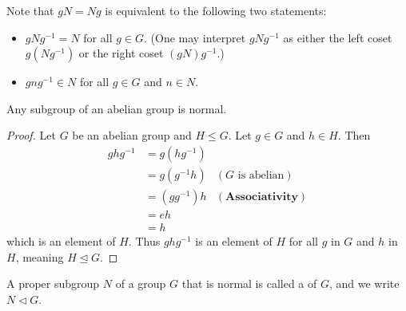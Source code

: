 Note that $gN = Ng$ is equivalent to the following two statements:
\begin{itemize}
    \item $gNg^{-1} = N$ for all $g \in G$. (One may interpret $gNg^{-1}$ as either the left coset $g(Ng^{-1})$ or the right coset $(gN)g^{-1}$.)
    \item $gng^{-1} \in N$ for all $g \in G$ and $n \in N$.
\end{itemize}

\begin{proposition}\label{prop-subgroup-of-abelian-group-is-normal}
    Any subgroup of an abelian group is normal.
\end{proposition}
\begin{proof}
    Let $G$ be an abelian group and $H \leq G$. Let $g \in G$ and $h \in H$. Then
    \begin{align*}
        ghg^{-1} &= g(hg^{-1})\\
        &= g(g^{-1}h) & (G \text{ is abelian})\\
        &= (gg^{-1})h & (\textbf{Associativity})\\
        &= eh\\
        &= h
    \end{align*}
    which is an element of $H$. Thus $ghg^{-1}$ is an element of $H$ for all $g$ in $G$ and $h$ in $H$, meaning $H \unlhd G$.
\end{proof}

\begin{definition}
    A proper subgroup $N$ of a group $G$ that is normal is called a  of $G$, and we write $N \lhd G$.
\end{definition}

